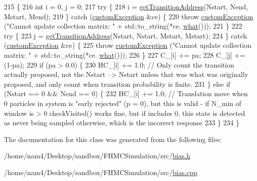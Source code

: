 \begin{DoxyCode}
215                                                                                                        \{
216     \textcolor{keywordtype}{int} i = 0, j = 0;
217     \textcolor{keywordflow}{try} \{
218         i = \hyperlink{classtmmc_ae296df3336ebf0fa1db7c34972c544eb}{getTransitionAddress}(Nstart, Nend, Mstart, Mend);
219     \} \textcolor{keywordflow}{catch} (\hyperlink{classcustom_exception}{customException} &ce) \{
220         \textcolor{keywordflow}{throw} \hyperlink{classcustom_exception}{customException} (\textcolor{stringliteral}{"Cannot update collection matrix: "} + std::to\_string(*ce.
      \hyperlink{classcustom_exception_aeb6ab5848b038adfc68fde86a512f691}{what}()));
221     \}
222     \textcolor{keywordflow}{try} \{
223         j = \hyperlink{classtmmc_ae296df3336ebf0fa1db7c34972c544eb}{getTransitionAddress}(Nstart, Nstart, Mstart, Mstart);
224     \} \textcolor{keywordflow}{catch} (\hyperlink{classcustom_exception}{customException} &ce) \{
225         \textcolor{keywordflow}{throw} \hyperlink{classcustom_exception}{customException} (\textcolor{stringliteral}{"Cannot update collection matrix: "} + std::to\_string(*ce.
      \hyperlink{classcustom_exception_aeb6ab5848b038adfc68fde86a512f691}{what}()));
226     \}
227     C\_[i] += pa;
228     C\_[j] += (1-pa);
229     \textcolor{keywordflow}{if} (pa > 0.0) \{
230         HC\_[i] += 1.0; \textcolor{comment}{// Only count the transition actually proposed, not the Nstart --> Nstart unless
       that was what was originally proposed, and only count when transition probability is finite.}
231     \} \textcolor{keywordflow}{else} \textcolor{keywordflow}{if} (Nstart == 0 && Nend == 0) \{
232         HC\_[i] += 1.0; \textcolor{comment}{// Translation move when 0 particles in system is "early rejected" (p = 0), but this
       is valid - if N\_min of window is > 0 checkVisited() works fine, but if includes 0, this state is detected
       as never being sampled otherwise, which is the incorrect response}
233     \}
234 \}
\end{DoxyCode}


The documentation for this class was generated from the following files\-:\begin{DoxyCompactItemize}
\item 
/home/nam4/\-Desktop/sandbox/\-F\-H\-M\-C\-Simulation/src/\hyperlink{bias_8h}{bias.\-h}\item 
/home/nam4/\-Desktop/sandbox/\-F\-H\-M\-C\-Simulation/src/\hyperlink{bias_8cpp}{bias.\-cpp}\end{DoxyCompactItemize}
